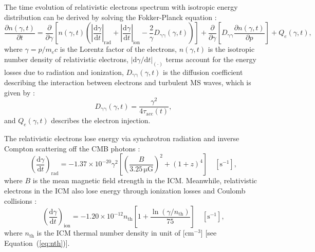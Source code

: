 \documentclass[modern]{aastex61}
\newcommand{\D}[1]{\mathrm{d} #1}
\newcommand{\diff}[2]{\frac{\D{#1}}{\D{#2}}}
\newcommand{\pdiff}[2]{\frac{\partial #1}{\partial #2}}
\newcommand{\uG}{\mathrm{\mu G}}
\begin{document}
The time evolution of relativistic electrons spectrum with isotropic energy
distribution can be derived by solving the Fokker-Planck equation
\citep{eilek1991,schlickeiser2002}:
\begin{equation}
  \label{eq:fokkerplanck}
  \pdiff{n(\gamma,t)}{t} = \pdiff{}{\gamma} \left[ n(\gamma,t) \left(
      \left| \diff{\gamma}{t} \right|_{\mathrm{rad}} +
      \left| \diff{\gamma}{t} \right|_{\mathrm{ion}} -
      \frac{2}{\gamma} D_{\mathrm{\gamma\gamma}}(\gamma, t) \right) \right] +
  \pdiff{}{\gamma} \left[ D_{\mathrm{\gamma\gamma}} \pdiff{n(\gamma,t)}{p} \right] +
  Q_e(\gamma,t),
\end{equation}
where $\gamma = p / m_e c$ is the Lorentz factor of the electrons,
$n(\gamma, t)$ is the isotropic number density of relativistic
electrons, $|\mathrm{d}\gamma / \mathrm{d}t|_{(\cdot)}$ terms account for the
energy losses due to radiation and ionization,
$D_{\mathrm{\gamma\gamma}}(\gamma, t)$ is the diffusion coefficient describing
the interaction between electrons and turbulent MS waves, which is given by
\citep{brunetti2011}:
\begin{equation}
  \label{eq:diffusion-coef}
  D_{\mathrm{\gamma\gamma}}(\gamma, t) =
    \frac{\gamma^2}{4 \tau_{\mathrm{acc}}(t)},
\end{equation}
and $Q_e(\gamma, t)$ describes the electron injection.

The relativistic electrons lose energy via synchrotron radiation
and inverse Compton scattering off the CMB photons \citep{sarazin1999}:
\begin{equation}
  \label{eq:eloss-rad}
  \left( \diff{\gamma}{t} \right)_{\mathrm{rad}} =
  -1.37 \times 10^{-20} \gamma^2
  \left[ \left( \frac{B}{3.25 \,\uG} \right)^2 +
  (1+z)^4 \right] \quad [\mathrm{s}^{-1}],
\end{equation}
where $B$ is the mean magnetic field strength in the ICM.
Meanwhile, relativistic electrons in the ICM also lose energy through
ionization losses and Coulomb collisions \citep{sarazin1999}:
\begin{equation}
  \label{eq:eloss-ion}
  \left( \diff{\gamma}{t} \right)_{\mathrm{ion}} =
  -1.20 \times 10^{-12} n_{\mathrm{th}} \left[ 1 +
    \frac{\ln(\gamma/n_{\mathrm{th}})}{75} \right] \quad [\mathrm{s}^{-1}],
\end{equation}
where $n_{\mathrm{th}}$ is the ICM thermal number density in unit of
[$\mathrm{cm}^{-3}$]
[see Equation~(\ref{eq:nth})].

\end{document}
